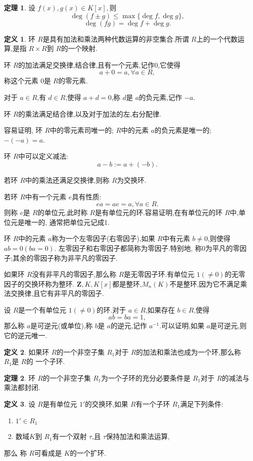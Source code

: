 \documentclass[a4paper,11pt]{article}%
\theoremstyle{remark}
\theoremstyle{definition}
\newtheorem{theorem}{定理}[section]
\theoremstyle{definition}
\newtheorem*{definition}{定义}
\theoremstyle{plain}
\begin{document}
\begin{theorem}
    设 $f(x),g(x)\in K[x],$则
    \[\deg(f\pm g)\leq \max\{\deg f,\deg g\},\]
    \[\deg(fg)=\deg f+\deg g.\]
\end{theorem}
\begin{definition}
    环 $R$是具有加法和乘法两种代数运算的非空集合.所谓 $R$上的一个代数运算,是指 $R\times R$到 $R$的一个映射.

    环 $R$的加法满足交换律,结合律,且有一个元素,记作0,它使得
    \[a+0=a,\forall a \in R,\]
    称这个元素 0是 $R$的零元素.
    
    对于 $a\in R $,有 $d\in R $,使得 $a+d=0$,称 $d$是 $a$的负元素,记作 $-a$.

    环 $R$的乘法满足结合律,以及对于加法的左,右分配律.
    
    容易证明, 环 $R$中的零元素司唯一的; $R$中的元素 $a$的负元素是唯一的; $-(-a)=a$.

    环 $R$中可以定义减法:
    \[a-b:=a+(-b).\]
    
    若环 $R$中的乘法还满足交换律,则称 $R$为交换环.

    若环 $R$中有一个元素 $e$具有性质:
    \[ea=ae=a,\forall a \in R.\]
    则称 $e$是 $R$的单位元,此时称 $R$是有单位元的环.容易证明,在有单位元的环 $R$中,单位元是唯一的,
    通常把单位元记成1.

    环 $R$中的元素 $a$称为一个左零因子(右零因子),如果 $R$中有元素 $b\neq 0$,则使得 $ab=0(ba=0).$
    左零因子和右零因子都简称为零因子.特别地, 称0为平凡的零因子;其余的零因子称为非平凡的零因子.

    如果环 $R$没有非平凡的零因子,那么称 $R$是无零因子环.有单位元 $1(\neq 0)$的无零因子的交换环称为整环.
    $\mathbf{Z},K,K[x]$都是整环,$M_n(K)$不是整环,因为它不满足乘法交换律,且它有非平凡的零因子.

    设 $R$是一个有单位元 $1(\neq 0)$的环.对于 $a\in R$,如果存在 $b\in R$,使得
    \[ab=ba=1,\]
    那么称 $a$是可逆元(或单位),称 $b$是 $a$的逆元,记作 $a^{-1}$.可以证明,如果 $a$是可逆元,则它的逆元唯一.
\end{definition}
\begin{definition}
    如果环 $R$的一个非空子集 $R_1$对于 $R$的加法和乘法也成为一个环,那么称 $R_1$是 $R$的
    一个子环.
\end{definition}
\begin{theorem}
    环 $R$的一个非空子集 $R_1$为一个子环的充分必要条件是 $R_1$对于 $R$的减法与乘法都封闭.
\end{theorem}
\begin{definition}
    设 $R$是有单位元 $1'$的交换环,如果 $R$有一个子环 $R_1$满足下列条件:
    \begin{enumerate}
        \item $1'\in R_1$
        \item  数域$K$到 $R_1$有一个双射 $\tau$,且 $\tau$保持加法和乘法运算,
    \end{enumerate}
    那么 称 $R$可看成是 $K$的一个扩环.
\end{definition}
\end{document}
